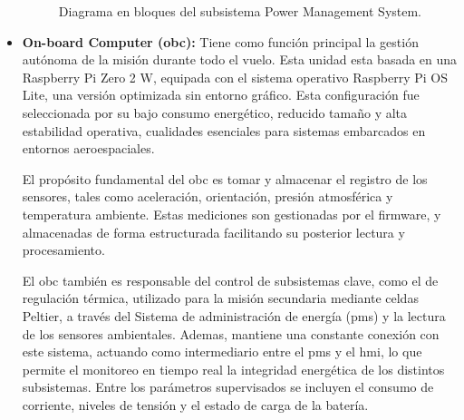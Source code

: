 \begin{itemize}
\begin{figure}[H]
{
        }
        \caption{Diagrama en bloques del subsistema Power Management System.}
        \label{fig:sistema_pms}
      \end{figure}

      \item \textbf{On-board Computer (\acrshort{obc}):} Tiene como función principal la gestión autónoma de
        la misión durante todo el vuelo. Esta unidad esta basada en una Raspberry Pi Zero 2
        W, equipada con el sistema operativo Raspberry Pi OS Lite, una versión optimizada sin
        entorno gráfico. Esta configuración fue seleccionada por su bajo consumo energético,
        reducido tamaño y alta estabilidad operativa, cualidades esenciales para sistemas embarcados
        en entornos aeroespaciales.

        El propósito fundamental del \acrshort{obc} es tomar y almacenar el registro de los sensores,
        tales como aceleración, orientación, presión atmosférica y temperatura ambiente. Estas
        mediciones son gestionadas por el firmware, y almacenadas de forma estructurada
        facilitando su posterior lectura y procesamiento.

        El \acrshort{obc} también es responsable del control de subsistemas clave, como el de regulación
        térmica, utilizado para la misión secundaria mediante celdas Peltier, a través del Sistema de
        administración de energía (\acrshort{pms}) y la lectura de los sensores ambientales. Ademas, mantiene una
        constante conexión con este sistema, actuando como intermediario entre el \acrshort{pms} y el \acrshort{hmi}, lo
        que permite el monitoreo en tiempo real la integridad energética de los distintos subsistemas.
        Entre los parámetros supervisados se incluyen el consumo de corriente, niveles de tensión y el
        estado de carga de la batería.


\end{itemize}
